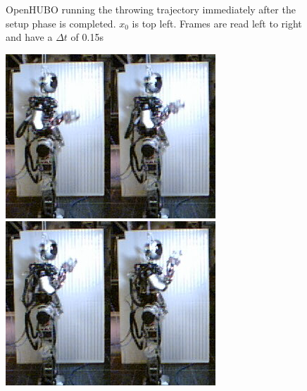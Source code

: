 \begin{figure}[h]
  \caption{OpenHUBO running the throwing trajectory immediately after the setup phase is completed.  $x_0$ is top left.  Frames are read left to right and have a $\Delta t$ of 0.15s\cite{dlofaro-srm}}
  \label{fig:fThrow}
\end{figure}

\begin{figure}[h]
  \centering
\includegraphics[width=0.25\columnwidth]{./pix/slowMotion/1.png}\includegraphics[width=0.25\columnwidth]{./pix/slowMotion/2.png}\includegraphics[width=0.25\columnwidth]{./pix/slowMotion/3.png}\includegraphics[width=0.25\columnwidth]{./pix/slowMotion/4.png}

\end{figure}
